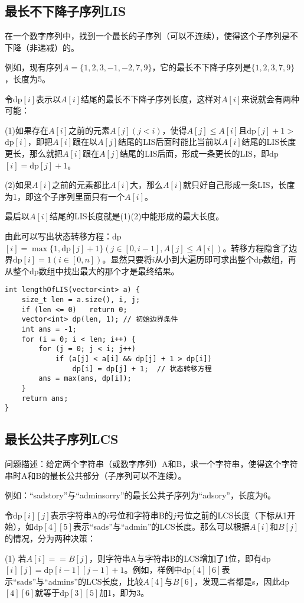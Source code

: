 \subsection{最长不下降子序列LIS}

在一个数字序列中，找到一个最长的子序列（可以不连续），使得这个子序列是不下降（非递减）的。

例如，现有序列$A=\{1,2,3,-1,-2,7,9\}$，它的最长不下降子序列是$\{1,2,3,7,9\}$，长度为5。

令dp$[i]$表示以$A[i]$结尾的最长不下降子序列长度，这样对$A[i]$来说就会有两种可能：

(1)如果存在$A[i]$之前的元素$A[j](j<i)$，使得$A[j]\leq A[i]$且dp$[j]+1>$dp$[i]$，即把$A[i]$跟在以$A[j]$结尾的LIS后面时能比当前以$A[i]$结尾的LIS长度更长，那么就把$A[i]$跟在$A[j]$结尾的LIS后面，形成一条更长的LIS，即dp$[i]=$dp$[j]+1$。

(2)如果$A[i]$之前的元素都比$A[i]$大，那么$A[i]$就只好自己形成一条LIS，长度为1，即这个子序列里面只有一个$A[i]$。

最后以$A[i]$结尾的LIS长度就是(1)(2)中能形成的最大长度。

由此可以写出状态转移方程：dp$[i]=\max\{1,\textrm{dp}[j]+1\}(j\in[0,i-1],A[j]\leq A[i])$。转移方程隐含了边界dp$[i]=1(i\in[0,n])$。显然只要将$i$从小到大遍历即可求出整个dp数组，再从整个dp数组中找出最大的那个才是最终结果。

\begin{lstlisting}
int lengthOfLIS(vector<int> a) {
	size_t len = a.size(), i, j;
	if (len <= 0)	return 0;
	vector<int> dp(len, 1);	// 初始边界条件
	int ans = -1;
	for (i = 0; i < len; i++) {
		for (j = 0; j < i; j++)
			if (a[j] < a[i] && dp[j] + 1 > dp[i])
				dp[i] = dp[j] + 1;	// 状态转移方程
		ans = max(ans, dp[i]);
	}
	return ans;
}
\end{lstlisting}

\subsection{最长公共子序列LCS}

问题描述：给定两个字符串（或数字序列）A和B，求一个字符串，使得这个字符串时A和B的最长公共部分（子序列可以不连续）。

例如：“sadstory”与“adminsorry”的最长公共子序列为“adsory”，长度为6。

令dp$[i][j]$表示字符串A的$i$号位和字符串B的$j$号位之前的LCS长度（下标从1开始），如dp$[4][5]$表示“sads”与“admin”的LCS长度。那么可以根据$A[i]$和$B[j]$的情况，分为两种决策：

(1) 若$A[i]==B[j]$，则字符串A与字符串B的LCS增加了1位，即有dp$[i][j]=$dp$[i-1][j-1]+1$。例如，样例中dp$[4][6]$表示“sads”与“admins”的LCS长度，比较$A[4]$与$B[6]$，发现二者都是s，因此dp$[4][6]$就等于dp$[3][5]$加1，即为3。

